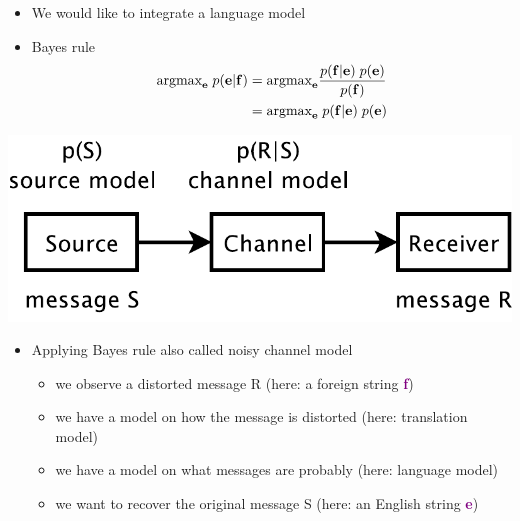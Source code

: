 \documentclass[landscape]{slides}
\newcommand{\maths}[1]{\textcolor{purple}{#1}}
\begin{document}

\begin{itemize}\vspace{20mm}
\item We would like to integrate a language model
\item Bayes rule
\maths{\begin{equation*}
\begin{split}
\mbox{argmax}_{\bf e} \; p({\bf e}|{\bf f}) &= \mbox{argmax}_{\bf e} \frac{p({\bf f}|{\bf e}) \; p({\bf e})}{p({\bf f})} \\
&= \mbox{argmax}_{\bf e} \; p({\bf f}|{\bf e}) \; p({\bf e})
\end{split}
\end{equation*}}
\end{itemize}


\vspace{10mm}
\begin{center}
\includegraphics[scale=1.1]{noisy-channel.pdf}
\end{center}
\vspace{5mm}
\begin{itemize}
\item Applying Bayes rule also called noisy channel model
\begin{itemize}
\item we observe a distorted message R (here: a foreign string \maths{\bf f})
\item we have a model on how the message is distorted (here: translation model)
\item we have a model on what messages are probably (here: language model)
\item we want to recover the original message S (here: an English string \maths{\bf e})
\end{itemize}
\end{itemize}
\end{document}
